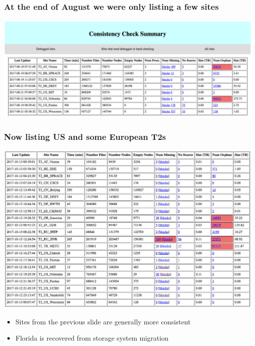 \documentclass{beamer}
\begin{document}
\begin{frame}
  \frametitle{At the end of August we were only listing a few sites}

  \includegraphics[width=\linewidth]{first_screenshot.png}

\end{frame}

\begin{frame}
  \frametitle{Now listing US and some European T2s}

  \includegraphics[width=\linewidth]{table.png}

  \begin{itemize}
  \item Sites from the previous slide are generally more consistent
  \item Florida is recovered from storage system migration
  \end{itemize}

\end{frame}
\end{document}
